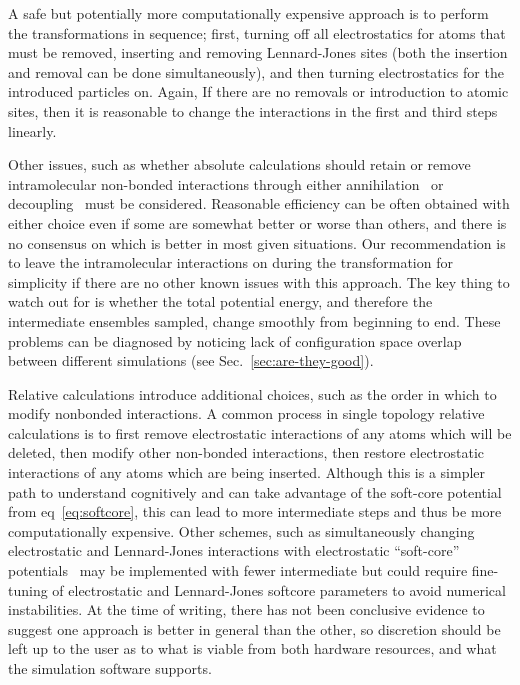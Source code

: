 \documentclass[9pt,bestpractices]{livecoms}
\begin{document}
A safe but potentially more computationally expensive approach is to perform the transformations in sequence; first, turning off all electrostatics for atoms that must be removed, inserting and removing Lennard-Jones sites (both the insertion and removal can be done simultaneously), and then turning electrostatics for the introduced particles on. Again, If there are no removals or introduction to atomic sites, then it is reasonable to change the interactions in the first and third steps  linearly. 

Other issues, such as whether absolute calculations should retain or remove intramolecular non-bonded interactions
through either annihilation~\cite{hermans1997inclusiona, mann2000modelinga, boresch2003absolutea, wang2006absolutea, mobley2006use} or decoupling~\cite{fujitani2005directa, mobley2006use} must be considered. Reasonable efficiency can be often obtained with either choice even if some are somewhat better or worse than others, and there is no consensus on which is better in most given situations. Our recommendation is to leave the intramolecular interactions on during the transformation for simplicity if there are no other known issues with this approach. The key thing to watch out for is whether the total potential energy, and therefore the intermediate ensembles sampled, change smoothly from beginning to end. These problems can be diagnosed by noticing lack of configuration space overlap between different simulations (see Sec.~\ref{sec:are-they-good}).

Relative calculations introduce additional choices, such as the order in which to modify nonbonded interactions.
A common process in single topology relative calculations is to first remove electrostatic interactions of any atoms which will be deleted, then modify other non-bonded interactions, then restore electrostatic interactions of any atoms which are being inserted. Although this is a simpler path to understand cognitively and can take advantage of the soft-core potential from eq~\ref{eq:softcore}, this can lead to more intermediate steps and thus be more computationally expensive.
Other schemes, such as simultaneously changing electrostatic and Lennard-Jones interactions with electrostatic ``soft-core'' potentials~\cite{steinbrecher2007nonlinear} may be implemented with fewer intermediate but could require fine-tuning of electrostatic and Lennard-Jones softcore parameters to avoid numerical instabilities. 
At the time of writing, there has not been conclusive evidence to suggest one approach is better in general than the other, so discretion should be left up to the user as to what is viable from both hardware resources, and what the simulation software supports.
\end{document}
